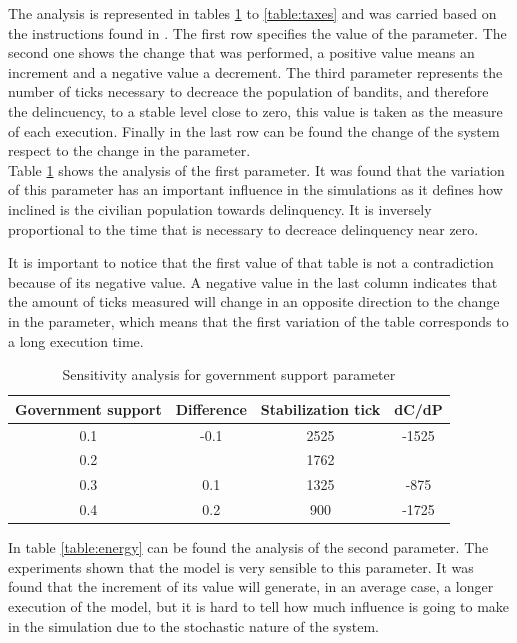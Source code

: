 \documentclass{wscpaperproc}
\begin{document}
The analysis is represented in tables \ref{table:government} to
\ref{table:taxes} and was carried based on the instructions found in
\cite{modbook}. The first row specifies the value of the parameter. The second
one shows the change that was performed, a positive value means an increment
and a negative value a decrement. The third parameter represents the number
of ticks necessary to decreace the population of bandits, and therefore the
delincuency, to a stable level close to zero, this value is taken as the
measure of each execution. Finally in the last row can be found the change of
the system respect to the change in the parameter.\\

Table \ref{table:government} shows the analysis of the first parameter. It was
found that the variation of this parameter has an important influence in the
simulations as it defines how inclined is the civilian population towards
delinquency. It is inversely proportional to the time that is necessary to
decreace delinquency near zero.

It is important to notice that the first value of that table is not a
contradiction because of its negative value. A negative value in the last
column indicates that the amount of ticks measured will change in an opposite
direction to the change in the parameter, which means that the first variation
of the table corresponds to a long execution time.\\

\begin{table}[h!]
    \centering
    \begin{tabular}{|c|c|c|c|}
        \hline
        Government support & Difference & Stabilization tick &  dC/dP\\
        \hline
        0.1 & -0.1 & 2525 & -1525\\
        \hline
        \rowcolor{lightgray}
        0.2 &      & 1762 & \\
        \hline
        0.3 & 0.1  & 1325 & -875\\
        \hline
        0.4 & 0.2  & 900 & -1725\\
        \hline
    \end{tabular}
    \caption{Sensitivity analysis for government support parameter}
    \label{table:government}
\end{table}

In table \ref{table:energy} can be found the analysis of the second
parameter. The experiments shown that the model is very sensible to this
parameter. It was found that the increment of its value will generate,
in an average case, a longer execution of the model, but it is hard to tell how
much influence is going to make in the simulation due to the stochastic
nature of the system.\\
\end{document}

